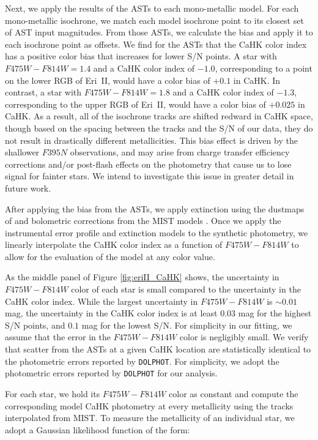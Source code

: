 \documentclass[twocolumn]{aastex63}
\begin{document}
\par Next, we apply the results of the ASTs to each mono-metallic model. For each mono-metallic isochrone, we match each model isochrone point to its closest set of AST input magnitudes. From those ASTs, we calculate the bias and apply it to each isochrone point as offsets. We find for the ASTs that the CaHK color index has a positive color bias that increases for lower S/N points. A star with $F475W - F814W = 1.4$ and a CaHK color index of $-1.0$, corresponding to a point on the lower RGB of Eri~II, would have a color bias of $+0.1$ in CaHK. In contrast, a star with $F475W - F814W = 1.8$ and a CaHK color index of $-1.3$, corresponding to the upper RGB of Eri~II, would have a color bias of $+0.025$ in CaHK. As a result, all of the isochrone tracks are shifted redward in CaHK space, though based on the spacing between the tracks and the S/N of our data, they do not result in drastically different metallicities. This bias effect is driven by the shallower $F395N$ observations, and may arise from charge transfer efficiency corrections and/or post-flash effects on the photometry that cause us to lose signal for fainter stars. We intend to investigate this issue in greater detail in future work.

\par After applying the bias from the ASTs, we apply extinction using the dustmaps of \citet{sfd1998} and bolometric corrections from the MIST models \citep{choi2016mist}. Once we apply the instrumental error profile and extinction models to the synthetic photometry, we linearly interpolate the CaHK color index as a function of $F475W-F814W$ to allow for the evaluation of the model at any color value.

\par As the middle panel of Figure \ref{fig:eriII_CaHK} shows, the uncertainty in $F475W - F814W$ color of each star is small compared to the uncertainty in the CaHK color index. While the largest uncertainty in $F475W - F814W$ is $\sim 0.01$ mag, the uncertainty in the CaHK color index is at least $0.03$ mag for the highest S/N points, and $0.1$ mag for the lowest S/N. For simplicity in our fitting, we assume that the error in the $F475W - F814W$ color is negligibly small. We verify that scatter from the ASTs at a given CaHK location are statistically identical to the photometric errors reported by \texttt{DOLPHOT}. For simplicity, we adopt the photometric errors reported by \texttt{DOLPHOT} for our analysis.

\par For each star, we hold its $F475W - F814W$ color as constant and compute the corresponding model CaHK photometry at every metallicity using the tracks interpolated from MIST. To measure the metallicity of an individual star, we adopt a Gaussian likelihood function of the form: 
\end{document}
